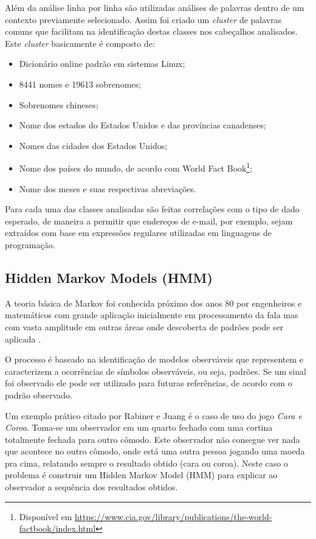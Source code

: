 \documentclass[
	12pt,               %
	openright,          %
	twoside,            %
	a4paper,            %
	english,            %
	brazil              %
	]{abntex2}
\begin{document}
Além da análise linha por linha são utilizadas análises de palavras dentro de um contexto previamente selecionado. Assim foi criado um \textit{cluster} de palavras comuns que facilitam na identificação destas classes nos cabeçalhos analisados. Este \textit{cluster} basicamente é composto de:

\begin{itemize}
\item Dicionário online padrão em sistemas Linux;
\item 8441 nomes e 19613 sobrenomes;
\item Sobrenomes chineses;
\item Nome dos estados do Estados Unidos e das províncias canadenses;
\item Nomes das cidades dos Estados Unidos;
\item Nome dos países do mundo, de acordo com World Fact Book\footnote{Disponível em \url{https://www.cia.gov/library/publications/the-world-factbook/index.html}};
\item Nome dos meses e suas respectivas abreviações.
\end{itemize}

Para cada uma das classes analisadas são feitas correlações com o tipo de dado esperado, de maneira a permitir que endereços de e-mail, por exemplo, sejam extraídos com base em expressões regulares utilizadas em linguagens de programação.

\subsection{Hidden Markov Models (HMM)}

A teoria básica de Markov foi conhecida próximo dos anos 80 por engenheiros e matemáticos com grande aplicação inicialmente em processamento da fala mas com vasta amplitude em outras áreas onde descoberta de padrões pode ser aplicada \cite{hmm}.

O processo é baseado na identificação de modelos observáveis que representem e caracterizem a ocorrências de símbolos observáveis, ou seja, padrões. Se um sinal foi observado ele pode ser utilizado para futuras referências, de acordo com o padrão observado.

Um exemplo prático citado por Rabiner e Juang \cite{hmm} é o caso de uso do jogo  \textit{Cara e Coroa}. Toma-se um observador em um quarto fechado com uma cortina totalmente fechada para outro cômodo. Este observador não consegue ver nada que acontece no outro cômodo, onde está uma outra pessoa jogando uma moeda pra cima, relatando sempre o resultado obtido (cara ou coroa). Neste caso o problema é construir um Hidden Markov Model (HMM) para explicar ao observador a sequência dos resultados obtidos. 
\end{document}
